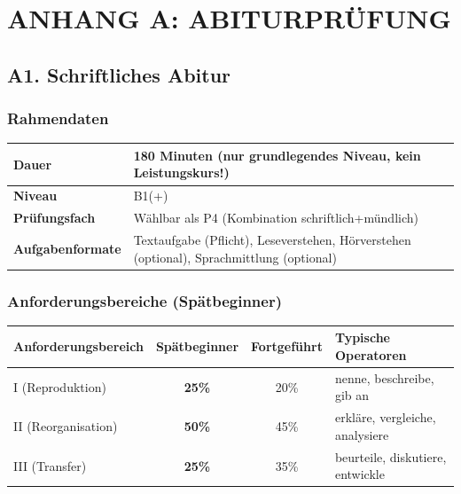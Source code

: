 \documentclass[10pt,a4paper]{article}
\begin{document}
\newpage


\section*{ANHANG A: ABITURPRÜFUNG}

\subsection{A1. Schriftliches Abitur}

\subsubsection{Rahmendaten}

\begin{center}
\small
\begin{tabular}{|p{5cm}|p{8cm}|}
\hline
\rowcolor{lightspaet}
\textbf{Dauer} & 180 Minuten (nur grundlegendes Niveau, kein Leistungskurs!) \\
\hline
\textbf{Niveau} & B1(+) \\
\hline
\textbf{Prüfungsfach} & Wählbar als P4 (Kombination schriftlich+mündlich) \\
\hline
\textbf{Aufgabenformate} & Textaufgabe (Pflicht), Leseverstehen, Hörverstehen (optional), Sprachmittlung (optional) \\
\hline
\end{tabular}
\end{center}

\subsubsection{Anforderungsbereiche (Spätbeginner)}

\begin{center}
\small
\begin{tabular}{|l|c|c|p{5cm}|}
\hline
\rowcolor{lightgray}
\textbf{Anforderungsbereich} & \textbf{Spätbeginner} & \textbf{Fortgeführt} & \textbf{Typische Operatoren} \\
\hline
I (Reproduktion) & \textcolor{spaet}{\textbf{25\%}} & 20\% & nenne, beschreibe, gib an \\
\hline
II (Reorganisation) & \textcolor{spaet}{\textbf{50\%}} & 45\% & erkläre, vergleiche, analysiere \\
\hline
III (Transfer) & \textcolor{spaet}{\textbf{25\%}} & 35\% & beurteile, diskutiere, entwickle \\
\hline
\end{tabular}
\end{center}
\end{document}
